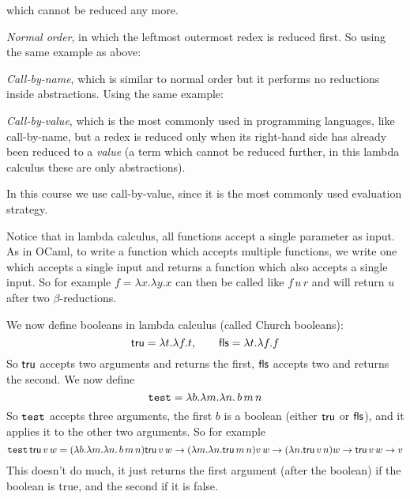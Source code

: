         which cannot be reduced any more.

    \item {\it Normal order}, in which the leftmost outermost redex is reduced first.
        So using the same example as above:


    \item {\it Call-by-name}, which is similar to normal order but it performs no reductions inside abstractions.
        Using the same example:


    \item {\it Call-by-value}, which is the most commonly used in programming languages, like call-by-name, but a redex is reduced only when its right-hand side has already been
        reduced to a {\it value} (a term which cannot be reduced further, in this lambda calculus these are only abstractions).

\eenum

In this course we use call-by-value, since it is the most commonly used evaluation strategy.

Notice that in lambda calculus, all functions accept a single parameter as input.
As in OCaml, to write a function which accepts multiple functions, we write one which accepts a single input and returns a function which also accepts a single input.
So for example $f=\lambda x.\lambda y.x$ can then be called like $f\,u\,r$ and will return $u$ after two $\beta$-reductions.

We now define booleans in lambda calculus (called Church booleans):
$$ \tru=\lambda t.\lambda f.t,\qquad \fls=\lambda t.\lambda f.f $$
So ${\sf tru}$ accepts two arguments and returns the first, ${\sf fls}$ accepts two and returns the second.
We now define
$$ \test=\lambda b.\lambda m.\lambda n.\,b\,m\,n $$
So $\test$ accepts three arguments, the first $b$ is a boolean (either ${\sf tru}$ or ${\sf fls}$), and it applies it to the other two arguments.
So for example
$$ \test\,\tru\,v\,w = (\lambda b.\lambda m.\lambda n.\,b\,m\,n)\tru\,v\,w \to (\lambda m.\lambda n.\tru\,m\,n)v\,w \to (\lambda n.\tru\,v\,n)w\to \tru\,v\,w \to v $$
This doesn't do much, it just returns the first argument (after the boolean) if the boolean is true, and the second if it is false.


